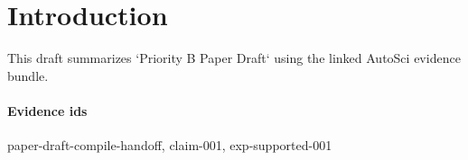 \section{Introduction}
This draft summarizes `Priority B Paper Draft` using the linked AutoSci evidence bundle.

\paragraph{Evidence ids} paper-draft-compile-handoff, claim-001, exp-supported-001
